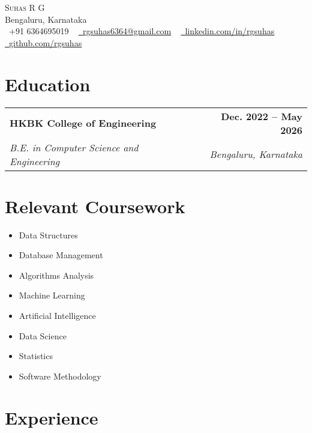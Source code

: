 \documentclass[letterpaper,11pt]{article}
\makeatletter
\newcommand{\resumeSubheading}[4]{
  \vspace{-2pt}\item
    \begin{tabular*}{1.0\textwidth}[t]{l@{\extracolsep{\fill}}r}
      \textbf{#1} & \textbf{\small #2} \\
      \textit{\small#3} & \textit{\small #4} \\
    \end{tabular*}\vspace{-7pt}
}
\makeatother
\begin{document}
\begin{center}
    {\Huge \scshape Suhas R G} \\ \vspace{1pt}
    Bengaluru, Karnataka \\ \vspace{1pt}
    \small \raisebox{-0.1\height}\faPhone\ +91 6364695019 ~ \href{mailto:rgsuhas6364@gmail.com}{\raisebox{-0.2\height}\faEnvelope\  \underline{rgsuhas6364@gmail.com}} ~ 
    \href{https://linkedin.com/in/rgsuhas}{\raisebox{-0.2\height}\faLinkedin\ \underline{linkedin.com/in/rgsuhas}}  ~
    \href{https://github.com/rgsuhas}{\raisebox{-0.2\height}\faGithub\ \underline{github.com/rgsuhas}}
    \vspace{-8pt}
\end{center}

\section{Education}
  \resumeSubHeadingListStart
    \resumeSubheading
      {HKBK College of Engineering}{Dec. 2022 -- May 2026}
      {B.E. in Computer Science and Engineering}{Bengaluru, Karnataka}
  \resumeSubHeadingListEnd

\section{Relevant Coursework}
    \begin{multicols}{3}
        \begin{itemize}[itemsep=-5pt, parsep=3pt]
            \item Data Structures
            \item Database Management
            \item Algorithms Analysis
            \item Machine Learning
            \item Artificial Intelligence
            \item Data Science
            \item Statistics
            \item Software Methodology
        \end{itemize}
    \end{multicols}
    \vspace*{2.0\multicolsep}

\section{Experience}
  \resumeSubHeadingListStart
\end{document}
